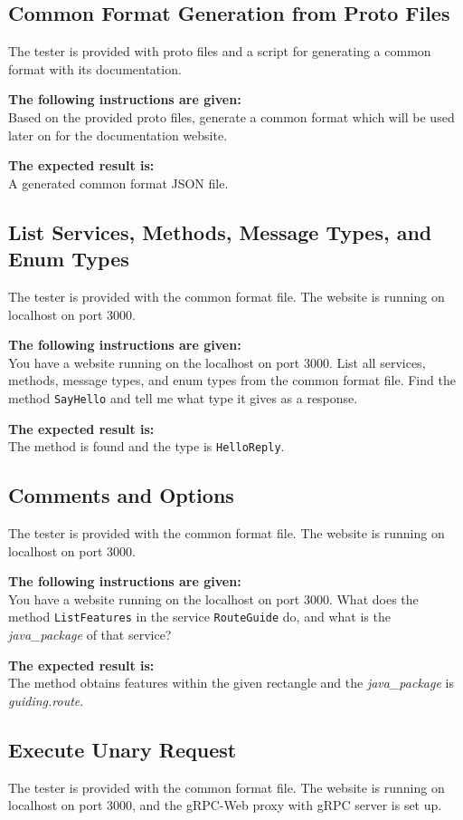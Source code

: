 \subsection{Common Format Generation from Proto Files}
The tester is provided with proto files and a script for generating a common format with its documentation.

\textbf{The following instructions are given:}\\
Based on the provided proto files, generate a common format which will be used later on for the documentation website.

\textbf{The expected result is:}\\
A generated common format JSON file.

\subsection{List Services, Methods, Message Types, and Enum Types}
The tester is provided with the common format file.
The website is running on localhost on port 3000.

\textbf{The following instructions are given:}\\
You have a website running on the localhost on port 3000.
List all services, methods, message types, and enum types from the common format file.
Find the method \texttt{SayHello} and tell me what type it gives as a response.

\textbf{The expected result is:}\\
The method is found and the type is \texttt{HelloReply}.

\subsection{Comments and Options}
The tester is provided with the common format file.
The website is running on localhost on port 3000.

\textbf{The following instructions are given:}\\
You have a website running on the localhost on port 3000.
What does the method \texttt{ListFeatures} in the service \texttt{RouteGuide} do, and what is the \textit{java\_package} of that service?

\textbf{The expected result is:}\\
The method obtains features within the given rectangle and the \textit{java\_package} is \textit{guiding.route}.

\subsection{Execute Unary Request}
The tester is provided with the common format file.
The website is running on localhost on port 3000, and the gRPC-Web proxy with gRPC server is set up.

